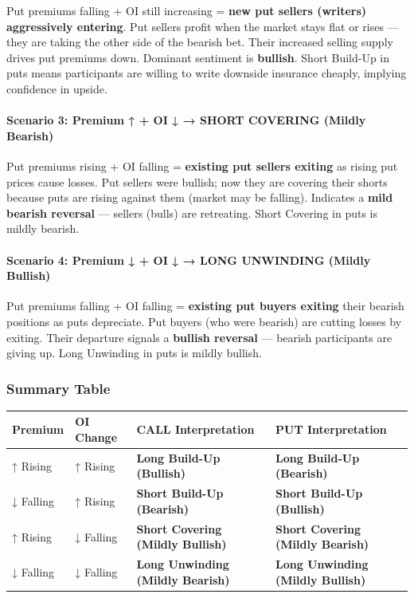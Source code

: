 \documentclass[12pt,openany]{book}
\begin{document}
Put premiums falling + OI still increasing = \textbf{new put sellers (writers) aggressively entering}. Put sellers profit when the market stays flat or rises — they are taking the other side of the bearish bet. Their increased selling supply drives put premiums down. Dominant sentiment is \textbf{bullish}. Short Build-Up in puts means participants are willing to write downside insurance cheaply, implying confidence in upside.

\paragraph{Scenario 3: Premium ↑ + OI ↓ → SHORT COVERING (Mildly Bearish)}

Put premiums rising + OI falling = \textbf{existing put sellers exiting} as rising put prices cause losses. Put sellers were bullish; now they are covering their shorts because puts are rising against them (market may be falling). Indicates a \textbf{mild bearish reversal} — sellers (bulls) are retreating. Short Covering in puts is mildly bearish.

\paragraph{Scenario 4: Premium ↓ + OI ↓ → LONG UNWINDING (Mildly Bullish)}

Put premiums falling + OI falling = \textbf{existing put buyers exiting} their bearish positions as puts depreciate. Put buyers (who were bearish) are cutting losses by exiting. Their departure signals a \textbf{bullish reversal} — bearish participants are giving up. Long Unwinding in puts is mildly bullish.

\subsubsection{Summary Table}

\begin{center}
\scriptsize
\setlength{\tabcolsep}{3pt}
\begin{tabular}{|L{3.30cm}|L{3.30cm}|L{3.30cm}|L{3.30cm}|}
\hline
Premium & OI Change & CALL Interpretation & PUT Interpretation \\
\hline
↑ Rising & ↑ Rising & \textbf{Long Build-Up (Bullish)} & \textbf{Long Build-Up (Bearish)} \\
\hline
↓ Falling & ↑ Rising & \textbf{Short Build-Up (Bearish)} & \textbf{Short Build-Up (Bullish)} \\
\hline
↑ Rising & ↓ Falling & \textbf{Short Covering (Mildly Bullish)} & \textbf{Short Covering (Mildly Bearish)} \\
\hline
↓ Falling & ↓ Falling & \textbf{Long Unwinding (Mildly Bearish)} & \textbf{Long Unwinding (Mildly Bullish)} \\
\hline
\end{tabular}
\end{center}
\end{document}
